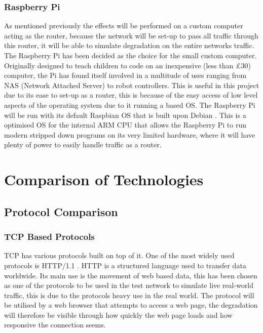 \subsubsection{Raspberry Pi}
As mentioned previously the effects will be performed on a custom computer acting as the router, because the network will be set-up to pass all traffic through this router, it will be able to simulate degradation on the entire networks traffic.
The Raspberry Pi \citep{upton2014raspberry} has been decided as the choice for the small custom computer. Originally designed to teach children to code on an inexpensive (less than £30) computer, the Pi has found itself involved in a multitude of uses ranging from NAS (Network Attached Server) to robot controllers. This is useful in this project due to its ease to set-up as a router, this is because of the easy access of low level aspects of the operating system due to it running a based OS. The Raspberry Pi will be run with its default Raspbian OS \citep{pi2014raspbian} that is built upon Debian \citep{murdock1994overview}. This is a optimised OS for the internal ARM CPU that allows the Raspberry Pi to run modern stripped down programs on its very limited hardware, where it will have plenty of power to easily handle traffic as a router.


\section{Comparison of Technologies}

\subsection{Protocol Comparison}
\subsubsection{TCP Based Protocols}
TCP has various protocols built on top of it. One of the most widely used protocols is HTTP/1.1 \citep{HTTP}. HTTP is a structured language used to transfer data worldwide. Its main use is the movement of web based data, this has been chosen as one of the protocols to be used in the test network to simulate live real-world traffic, this is due to the protocols heavy use in the real world. The protocol will be utilised by a web browser that attempts to access a web page, the degradation will therefore be visible through how quickly the web page loads and how responsive the connection seems.


